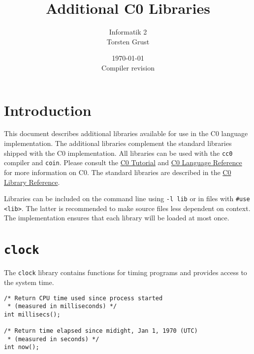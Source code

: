\documentclass[11pt]{article}
\title{Additional C0 Libraries}
\author{Informatik 2 \\ Torsten Grust}
\date{\today\\Compiler revision \rev}
\begin{document}
\maketitle

\section{Introduction}

This document describes additional libraries available for use in the
C0 language implementation. The additional libraries complement the
standard libraries shipped with the C0 implementation. All libraries
can be used with the \lstinline'cc0' compiler and \lstinline'coin'.  Please
consult the \href{http://c0.typesafety.net/tutorial}{C0 Tutorial} and
\href{http://c0.typesafety.net/doc/c0-reference.pdf}{C0 Language
  Reference} for more information on C0. The standard libraries are
described in the \href{http://c0.typesafety.net/tutorial}{C0 Library
  Reference}.

Libraries can be included on the command line using \lstinline'-l lib' or in
files with \lstinline'#use <lib>'.  The latter is recommended to make
source files less dependent on context.  The implementation ensures
that each library will be loaded at most once.

\section{\tt clock}
\label{sec:tt-clock}

The \lstinline'clock' library contains functions for timing programs and
provides access to the system time.

\begin{lstlisting}
/* Return CPU time used since process started
 * (measured in milliseconds) */
int millisecs();

/* Return time elapsed since midight, Jan 1, 1970 (UTC)
 * (measured in seconds) */
int now();
\end{lstlisting}
\end{document}
